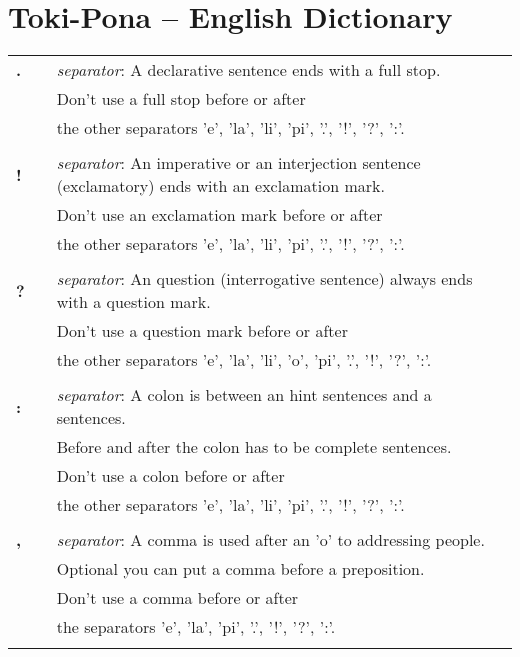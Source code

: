 \section{Toki-Pona -- English Dictionary}
\label{'dict'}
%
\begin{supertabular}{p{2,5cm}|ll}
\textbf{.} && \textit{separator}: A declarative sentence ends with a full stop. \\ && Don't use a full stop before or after \\ && the other separators 'e', 'la', 'li', 'pi', '.', '!', '?', ':'. \\ 
 && \\ %
\textbf{!} && \textit{separator}: An imperative or an interjection sentence (exclamatory) ends with an exclamation mark. \\ && Don't use an exclamation mark before or after \\ && the other separators 'e', 'la', 'li', 'pi', '.', '!', '?', ':'.  \\ 
 && \\ %
\textbf{?} && \textit{separator}: An question (interrogative sentence) always ends with a question mark. \\ && Don't use a question mark before or after \\ && the other separators 'e', 'la', 'li', 'o', 'pi', '.', '!', '?', ':'. \\
 && \\ %
\textbf{:} && \textit{separator}: A colon is between an hint sentences and a sentences. \\  && Before and after the colon has to be complete sentences.  \\  && Don't use a colon before or after \\ && the other separators 'e', 'la', 'li', 'pi', '.', '!', '?', ':'.   \\ 
 && \\ %
\textbf{,} && \textit{separator}: A comma is used after an 'o' to addressing people. \\ &&  Optional you can put a comma before a preposition. \\ && Don't use a comma before or after \\ && the separators 'e', 'la', 'pi', '.', '!', '?', ':'.  \\ 
 && \\ %

\end{supertabular}

